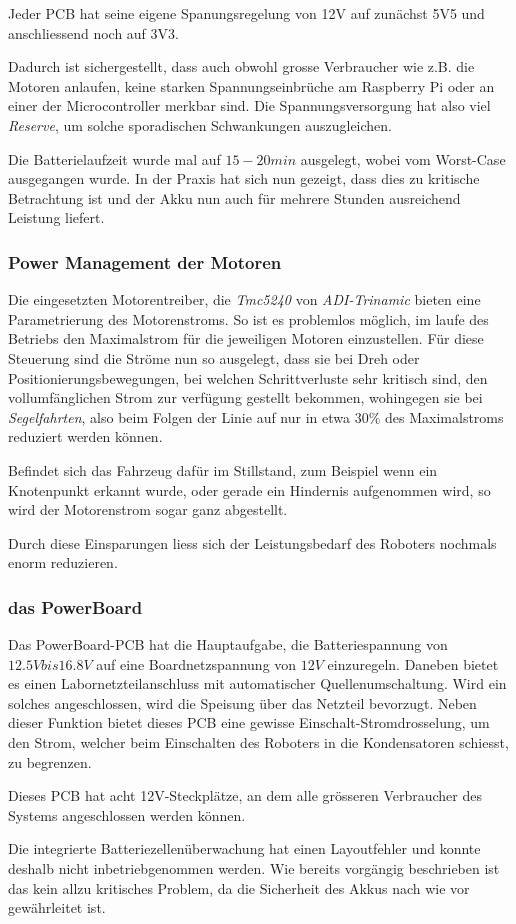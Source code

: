 \documentclass[main.tex]{subfiles} %
\begin{document}
Jeder PCB hat seine eigene Spanungsregelung von 12V auf zunächst 5V5 und
anschliessend noch auf 3V3.


Dadurch ist sichergestellt, dass auch obwohl grosse Verbraucher wie z.B. die
Motoren anlaufen, keine starken Spannungseinbrüche am Raspberry Pi oder an
einer der Microcontroller merkbar sind. Die Spannungsversorgung hat also viel
\textit{Reserve}, um solche sporadischen Schwankungen auszugleichen.

Die Batterielaufzeit wurde mal auf $15 - 20 min$ ausgelegt, wobei vom
Worst-Case ausgegangen wurde. In der Praxis hat sich nun gezeigt, dass dies zu
kritische Betrachtung ist und der Akku nun auch für mehrere Stunden ausreichend
Leistung liefert.

\subsubsection*{Power Management der Motoren}

Die eingesetzten Motorentreiber, die \textit{Tmc5240} von \textit{ADI-Trinamic}
bieten eine Parametrierung des Motorenstroms. So ist es problemlos möglich, im
laufe des Betriebs den Maximalstrom für die jeweiligen Motoren einzustellen.
Für diese Steuerung sind die Ströme nun so ausgelegt, dass sie bei Dreh oder
Positionierungsbewegungen, bei welchen Schrittverluste sehr kritisch sind, den
vollumfänglichen Strom zur verfügung gestellt bekommen, wohingegen sie bei
\textit{Segelfahrten}, also beim Folgen der Linie auf nur in etwa $30\%$ des
Maximalstroms reduziert werden können.

Befindet sich das Fahrzeug dafür im Stillstand, zum Beispiel wenn ein
Knotenpunkt erkannt wurde, oder gerade ein Hindernis aufgenommen wird, so wird
der Motorenstrom sogar ganz abgestellt.

Durch diese Einsparungen liess sich der Leistungsbedarf des Roboters nochmals
enorm reduzieren.

\subsubsection*{das PowerBoard}
Das PowerBoard-PCB hat die Hauptaufgabe, die Batteriespannung von $12.5V bis
    16.8V$ auf eine Boardnetzspannung von $12V$ einzuregeln. Daneben bietet es
einen Labornetzteilanschluss mit automatischer Quellenumschaltung. Wird ein
solches angeschlossen, wird die Speisung über das Netzteil bevorzugt. Neben
dieser Funktion bietet dieses PCB eine gewisse Einschalt-Stromdrosselung, um den
Strom, welcher beim Einschalten des Roboters in die Kondensatoren schiesst, zu
begrenzen.

Dieses PCB hat acht 12V-Steckplätze, an dem alle grösseren Verbraucher des
Systems angeschlossen werden können.

Die integrierte Batteriezellenüberwachung hat einen Layoutfehler und konnte
deshalb nicht inbetriebgenommen werden. Wie bereits vorgängig beschrieben ist
das kein allzu kritisches Problem, da die Sicherheit des Akkus nach wie vor
gewährleitet ist. %
\end{document}
